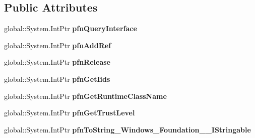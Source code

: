 \subsection*{Public Attributes}
\begin{DoxyCompactItemize}
\item 
\mbox{\label{struct_windows_1_1_foundation_1_1_i_stringable_____impl_1_1_vtbl_a6443de77a7837f9436fc7806c5ae9595}} 
global\+::\+System.\+Int\+Ptr {\bfseries pfn\+Query\+Interface}
\item 
\mbox{\label{struct_windows_1_1_foundation_1_1_i_stringable_____impl_1_1_vtbl_abdc93ffcd857dabf9e768cc77bfdfaf9}} 
global\+::\+System.\+Int\+Ptr {\bfseries pfn\+Add\+Ref}
\item 
\mbox{\label{struct_windows_1_1_foundation_1_1_i_stringable_____impl_1_1_vtbl_ad16feefa06ae9dcaa2f2a91a795a1676}} 
global\+::\+System.\+Int\+Ptr {\bfseries pfn\+Release}
\item 
\mbox{\label{struct_windows_1_1_foundation_1_1_i_stringable_____impl_1_1_vtbl_a0e6f523ff2495677481a7678db848ec9}} 
global\+::\+System.\+Int\+Ptr {\bfseries pfn\+Get\+Iids}
\item 
\mbox{\label{struct_windows_1_1_foundation_1_1_i_stringable_____impl_1_1_vtbl_a8faa5a36cbeaea79cc89c6fb421f8526}} 
global\+::\+System.\+Int\+Ptr {\bfseries pfn\+Get\+Runtime\+Class\+Name}
\item 
\mbox{\label{struct_windows_1_1_foundation_1_1_i_stringable_____impl_1_1_vtbl_ad6c439b43cfed6a8f49f76e4378e745d}} 
global\+::\+System.\+Int\+Ptr {\bfseries pfn\+Get\+Trust\+Level}
\item 
\mbox{\label{struct_windows_1_1_foundation_1_1_i_stringable_____impl_1_1_vtbl_a54d1d2c5099a32547c5e2b09ea865885}} 
global\+::\+System.\+Int\+Ptr {\bfseries pfn\+To\+String\+\_\+\+Windows\+\_\+\+Foundation\+\_\+\+\_\+\+I\+Stringable}
\end{DoxyCompactItemize}

